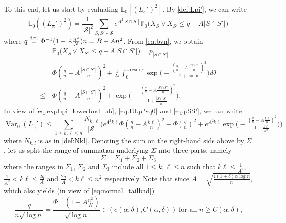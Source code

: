 \documentclass[11pt,reqno,letterpaper]{amsart}
\numberwithin{equation}{section}
\theoremstyle{plain}
\def \bpi{\boldsymbol{\pi}}
\def \E{\mathbb{E}}
\def \P{\mathbb{P}}
\providecommand{\var}{\operatorname{Var}}
\begin{document}
\smallskip

To this end, let us start by evaluating $\E_0[(L_{\bpi}')^2]$. By \eqref{def:Lpi'}, we 
can write
\begin{equation}\label{eq:ELpi'sq0}
 \E_0((L_{\bpi}')^2) = \frac 1{|\mathcal S|^2} \sum_{S, S' \in \mathcal S} e^{A^2|S \cap S'|} \, \P_0 \big( X_{S} \vee X_{S'} \le  q - A|S \cap S'| \big)
\end{equation}
where $q \stackrel{{\rm def.}}{=} \Phi^{-1}(1 - A\tfrac{n^2}{N})n = B - An^2$. From \eqref{eq:bvn}, we obtain
\begin{equation}\label{eq:pSS'}
\begin{split}
&\, \P_0 \big( X_{S} \vee X_{S'} \le  q - A|S \cap S'| \big) = p_{|S \cap S'|} \\
=&\, \Phi(\tfrac q{n} - A\tfrac{|S \cap S'|}{n})^2 + \frac 1{2\pi}\int_0^{\arcsin{\rho}} \exp\big(-\tfrac{(\tfrac{q}{n} - A\tfrac{|S \cap S'|}{n})^2}
{1 + \sin\theta} \big) d\theta\\
\le&\, \Phi(\tfrac q{n} - A\tfrac{|S \cap S'|}{n})^2 + \exp\big(- \tfrac{(\tfrac{q}{n} - A\frac{|S \cap S'|}{n})^2}{1 + \frac{|S \cap S'|}{n^2}}\big).
\end{split}
\end{equation}
In view of \eqref{eq:expLpi_lowerbnd_ab}, \eqref{eq:ELpi'sq0} and \eqref{eq:pSS'}, we 
can write
\begin{equation}\label{eq:var_bnd}
 \var_0(L_{\bpi}') \le \sum_{1 \le k, \ell \le n} \frac{N_{k, \ell}}{|\mathcal S|} \Big(e^{A^2k\ell} \Phi(\tfrac{q}{n} - A\tfrac{k\ell}{n})^2 - \Phi(\tfrac{q}{n})^2 + e^{A^2k\ell} \exp\big(- \tfrac{(\tfrac qn -  A\frac{k\ell}{n})^2}{1 + \frac{k\ell}{n^2}}\big)\Big)
\end{equation}
where $N_{k, l}$ is as in \eqref{def:Nkl}. Denoting the sum on the right-hand side above by $\Sigma$, let us split the range of summation 
underlying $\Sigma$ into three parts, namely
\begin{equation}\label{eq:var_decomp}
\Sigma = \Sigma_1 + \Sigma_2 + \Sigma_3
\end{equation}
where the ranges in $\Sigma_1$, $\Sigma_2$ and $\Sigma_3$ include all $1 \le k, \ell 
\le n$ such that $k\ell \le \tfrac 1 {A^2}$, $\tfrac 1 {A^2} < k\ell \le \tfrac {2q}A$ 
and $\tfrac {2q}A < k\ell \le n^{2}$ respectively. Note that since $A = \sqrt{\frac{4(1+\delta)\alpha\log n}{n}}$, which also yields (in view of \eqref{eq:normal_tailbnd})
\begin{equation}\label{eq:range_q}
\frac q{n \sqrt{\log n}} = \frac {\Phi^{-1}(1 - A \frac{n^2}N)}{\sqrt{\log n}} \in (c(\alpha, \delta), C(\alpha, \delta)) \mbox{ for all $n\ge C(\alpha, \delta)$,}
\end{equation}
\end{document}

